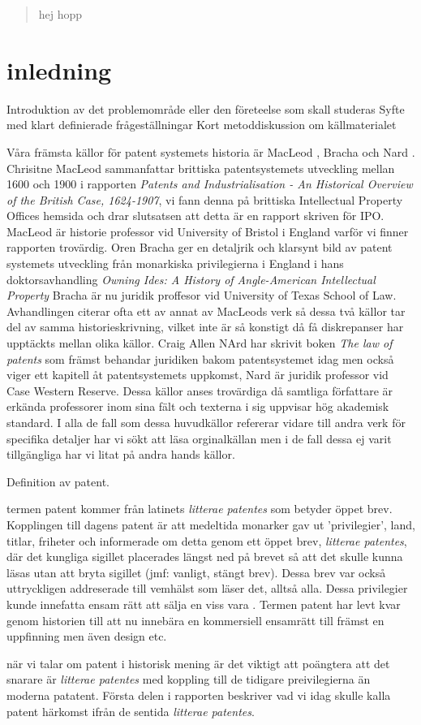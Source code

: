 \begin{abstract} hej hopp \end{abstract}

\section{inledning} Introduktion av det problemområde eller den företeelse som skall studeras Syfte med
klart definierade frågeställningar Kort metoddiskussion om källmaterialet

Våra främsta källor för patent systemets historia är MacLeod \cite{macleod}, Bracha \cite{bracha} och Nard
\cite{nard}. Chrisitne MacLeod sammanfattar brittiska patentsystemets utveckling mellan 1600 och 1900 i
rapporten \emph{Patents and Industrialisation - An Historical Overview of the British Case, 1624-1907}, vi
fann denna på brittiska Intellectual Property Offices hemsida och drar slutsatsen att detta är en rapport
skriven för IPO. MacLeod är historie professor vid University of Bristol i England varför vi finner
rapporten trovärdig. Oren Bracha ger en detaljrik och klarsynt bild av patent systemets utveckling från
monarkiska privilegierna i England i hans doktorsavhandling \emph{Owning Ides: A History of Angle-American
Intellectual Property} Bracha är nu juridik proffesor vid University of Texas School of Law. Avhandlingen
citerar ofta ett av annat av MacLeods verk så dessa två källor tar del av samma historieskrivning, vilket
inte är så konstigt då få diskrepanser har upptäckts mellan olika källor. Craig Allen NArd har skrivit
boken \emph{The law of patents} som främst behandar juridiken bakom patentsystemet idag men också viger ett
kapitell åt patentsystemets uppkomst, Nard är juridik professor vid Case Western Reserve. Dessa källor
anses trovärdiga då samtliga författare är erkända professorer inom sina fält och texterna i sig uppvisar
hög akademisk standard. I alla de fall som dessa huvudkällor refererar vidare till andra verk för specifika
detaljer har vi sökt att läsa orginalkällan men i de fall dessa ej varit tillgängliga har vi litat på andra
hands källor.

Definition av patent.

termen patent kommer från latinets \emph{litterae patentes} som betyder öppet brev. Kopplingen till dagens
patent är att medeltida monarker gav ut 'privilegier', land, titlar, friheter och informerade om detta
genom ett öppet brev, \emph{litterae patentes}, där det kungliga sigillet placerades längst ned på brevet
så att det skulle kunna läsas utan att bryta sigillet (jmf: vanligt, stängt brev). Dessa brev var också
uttryckligen addreserade till vemhälst som läser det, alltså alla. Dessa privilegier kunde innefatta ensam
rätt att sälja en viss vara \cite{blackstone}. Termen patent har levt kvar genom historien till att nu
innebära en kommersiell ensamrätt till främst en uppfinning men även design etc.

när vi talar om patent i historisk mening är det viktigt att poängtera att det snarare är \emph{litterae
patentes} med koppling till de tidigare preivilegierna än moderna patatent. Första delen i rapporten
beskriver vad vi idag skulle kalla patent härkomst ifrån de sentida \emph{litterae patentes}.
